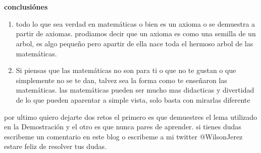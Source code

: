 \documentclass{article}
\begin{document}
\\ \\ 
\begin{center}
    \textbf{conclusiónes}
\end{center}
\begin{enumerate}
    \item todo lo que sea verdad en matemáticas o bien es un axioma o se demuestra a partir de axiomas. 
    prodiamos decir que un axioma es como una semilla de un arbol, es algo pequeño pero apartir de ella nace toda el hermoso arbol de las matemáticas.
    \item Si piensas que las matemáticas no son para ti o que no te gustan o que simplemente no se te dan, talvez sea la forma como te enseñaron
    las matemáticas. las matemáticas pueden ser mucho mas didacticas y divertidad de lo que pueden aparentar a simple vista, solo basta con mirarlas diferente
\end{enumerate}
por ultimo quiero dejarte dos retos el primero es que demuestres el lema utilizado en la Demostración y el otro es que nunca pares de aprender. 
si tienes dudas escribeme un comentario en este blog o escribeme a mi twitter @WilsonJerez estare feliz de resolver tus dudas.
\end{document}
